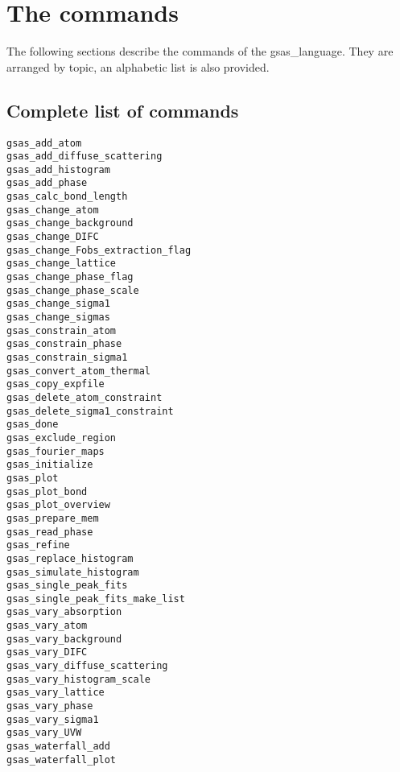 \newcommand{\glcommand}[6]{

\subsection{#1}
\leftskip2em #2\\
\\
\leftskip2em \textbf{Syntax:}\\
\\
\leftskip2em \texttt{#3}\\
\\
\leftskip2em \textbf{Parameters:}
\begin{itemize}
\leftskip2em #4
\end{itemize}
\leftskip2em \textbf{Example:}\\
\\
\leftskip2em \texttt{#5}\\
\\
\leftskip2em #6\\
}




\chapter{The commands}
The following sections describe the commands of the gsas\_language. They are arranged by topic, an alphabetic list is also provided.

\section{Complete list of commands}

\begin{verbatim}
gsas_add_atom
gsas_add_diffuse_scattering
gsas_add_histogram
gsas_add_phase
gsas_calc_bond_length
gsas_change_atom
gsas_change_background
gsas_change_DIFC
gsas_change_Fobs_extraction_flag
gsas_change_lattice
gsas_change_phase_flag
gsas_change_phase_scale
gsas_change_sigma1
gsas_change_sigmas
gsas_constrain_atom
gsas_constrain_phase
gsas_constrain_sigma1
gsas_convert_atom_thermal
gsas_copy_expfile
gsas_delete_atom_constraint
gsas_delete_sigma1_constraint
gsas_done
gsas_exclude_region
gsas_fourier_maps
gsas_initialize
gsas_plot
gsas_plot_bond
gsas_plot_overview
gsas_prepare_mem
gsas_read_phase
gsas_refine
gsas_replace_histogram
gsas_simulate_histogram
gsas_single_peak_fits
gsas_single_peak_fits_make_list
gsas_vary_absorption
gsas_vary_atom
gsas_vary_background
gsas_vary_DIFC
gsas_vary_diffuse_scattering
gsas_vary_histogram_scale
gsas_vary_lattice
gsas_vary_phase
gsas_vary_sigma1
gsas_vary_UVW
gsas_waterfall_add
gsas_waterfall_plot
\end{verbatim}

